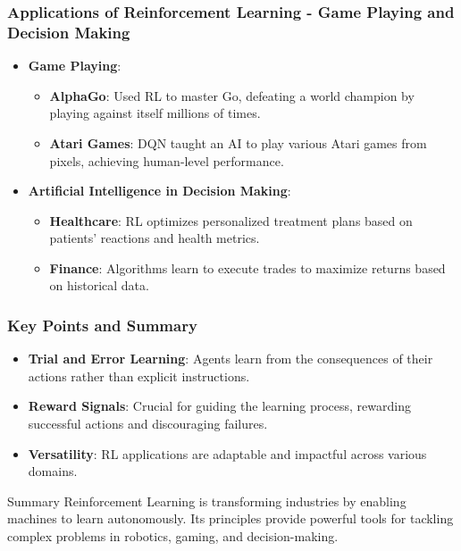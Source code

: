 \documentclass[aspectratio=169]{beamer}
\begin{document}
\begin{frame}[fragile]
    \frametitle{Applications of Reinforcement Learning - Game Playing and Decision Making}
    
    \begin{itemize}
        \item \textbf{Game Playing}:
        \begin{itemize}
            \item \textbf{AlphaGo}: Used RL to master Go, defeating a world champion by playing against itself millions of times.
            \item \textbf{Atari Games}: DQN taught an AI to play various Atari games from pixels, achieving human-level performance.
        \end{itemize}
        
        \item \textbf{Artificial Intelligence in Decision Making}:
        \begin{itemize}
            \item \textbf{Healthcare}: RL optimizes personalized treatment plans based on patients' reactions and health metrics.
            \item \textbf{Finance}: Algorithms learn to execute trades to maximize returns based on historical data.
        \end{itemize}
    \end{itemize}
\end{frame}

\begin{frame}[fragile]
    \frametitle{Key Points and Summary}
    
    \begin{itemize}
        \item \textbf{Trial and Error Learning}: Agents learn from the consequences of their actions rather than explicit instructions.
        \item \textbf{Reward Signals}: Crucial for guiding the learning process, rewarding successful actions and discouraging failures.
        \item \textbf{Versatility}: RL applications are adaptable and impactful across various domains.
    \end{itemize}
    
    \begin{block}{Summary}
        Reinforcement Learning is transforming industries by enabling machines to learn autonomously. Its principles provide powerful tools for tackling complex problems in robotics, gaming, and decision-making.
    \end{block}
\end{frame}
\end{document}
